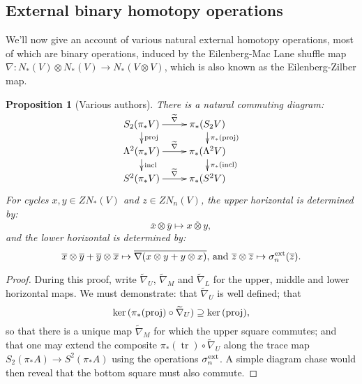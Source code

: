 \documentclass[11pt]{amsart}
\theoremstyle{plain}
\newtheorem{prop}[thm]{Proposition}
\theoremstyle{definition}
\renewcommand{\ker}{\textup{ker}\,}
\DeclareMathOperator{\trace}{tr}
\renewcommand{\to}{\longrightarrow}
\newcommand{\calV}{\mathcal{V}}
\theoremstyle{plain}
\newcommand{\vect}[2]{\calV^{#1}_{#2}}
\begin{document}
\begin{Constructing homotopy and cohomotopy operations}
\subsection{External binary homotopy operations}
We'll now give an account of various natural external homotopy operations, most of which are binary operations, induced by the  Eilenberg-Mac Lane shuffle map $\nabla:N_*(V)\otimes N_*(V)\to N_*(V\otimes V)$, which is also known as the Eilenberg-Zilber map.
\begin{prop}[Various authors]\label{the top external homotopy operations}
There is a natural commuting diagram:
\[\xymatrix@R=4mm{
S_2(\pi_*V)\ar[r]^-{\smash{\widetilde{\nabla}}}
\ar[d]^-{\textup{proj}}
&%
\pi_*(S_2V)\ar[d]^-{\pi_*(\textup{proj})}
\\%
\Lambda^2(\pi_*V)\ar[r]^-{\widetilde{\nabla}}
\ar[d]^-{\textup{incl}}
&%
\pi_*(\Lambda^2V)\ar[d]^-{\pi_*(\textup{incl})}
\\%
S^2(\pi_*V)\ar[r]^-{\widetilde{\nabla}}&%
\pi_*(S^2V)%
}\]
For cycles $x,y\in ZN_*(V)$ and $z\in ZN_n(V)$, the upper horizontal is determined by:
\[\overline{x}\otimes\overline{y}\mapsto \overline{x\otimes y},\]
and the lower horizontal is determined by:
\[\overline{x}\otimes\overline{y}+\overline{y}\otimes \overline{x}\mapsto\overline{\nabla(x\otimes y+y\otimes x)}\textup{, and }\overline{z}\otimes\overline{z}\mapsto\sigma^\textup{ext}_n(\overline{z}).\]
\end{prop}
\begin{proof}
During this proof, write $\widetilde{\nabla}_U$, $\widetilde{\nabla}_M$ and $\widetilde{\nabla}_L$ for the upper, middle and lower horizontal maps. We must demonstrate: that $\widetilde{\nabla}_U$  is well defined; that
\[\ker(\pi_*(\textup{proj})\circ\widetilde{\nabla}_U)\supseteq\ker(\textup{proj}),\]
so that there is a unique map $\widetilde{\nabla}_M$ for which the upper square commutes; and that one may extend the composite $\pi_*(\trace)\circ\widetilde{\nabla}_U$ along the trace map $S_2(\pi_*A)\to S^2(\pi_*A)$ using the operations
$\sigma_n^\textup{ext}$.
A simple diagram chase would then reveal that the bottom square must also commute.


\end{proof}
\end{Constructing homotopy and cohomotopy operations}
\end{document}
